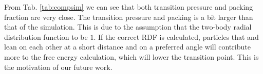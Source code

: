 From Tab. \ref{tab:compsim} we can see that both transition pressure and packing fraction are very close. The transition pressure and packing is a bit larger than that of the simulation. This is due to the assumption that the two-body radial distribution function to be $1$. If the correct RDF is calculated, particles that and lean on each other at a short distance and on a preferred angle will contribute more to the free energy calculation, which will lower the transition point. This is the motivation of our future work.




